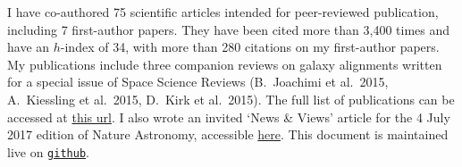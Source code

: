 I have co-authored 75 scientific articles intended for peer-reviewed 
publication, including 7 first-author papers. They have been cited more than 
3,400 times and have an $h$-index of 34, with more than 280 citations on my 
first-author papers. My publications include three companion reviews on galaxy 
alignments written for a special issue of Space Science Reviews (B.\ Joachimi et 
al.\ 2015, A.\ Kiessling et al.\ 2015, D.\ Kirk et al.\ 2015). The full list of 
publications can be accessed at \href{https://goo.gl/LAu9G4}{this url}. I also 
wrote an invited `News \& Views' article for the 4 July 2017 edition of Nature 
Astronomy, accessible 
\href{https://www.nature.com/articles/s41550-017-0181}{here}.
%
This document is maintained live on
\href{https://github.com/cristobal-sifon/cv/blob/master/Sifon_publications.pdf}{\texttt{github}}.

